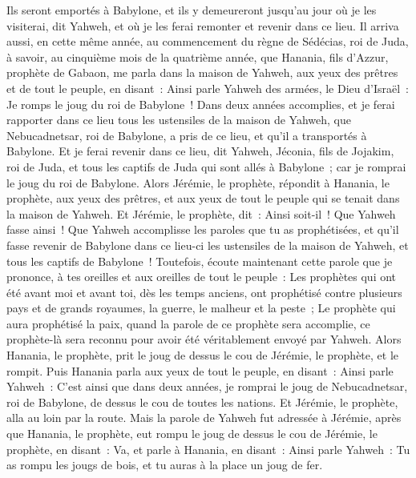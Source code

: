 \begin{multicols}{2}
Ils seront emportés à Babylone, et ils y demeureront jusqu'au jour où je les visiterai, dit Yahweh, et où je les ferai remonter et revenir dans ce lieu.
\VerseOne{}Il arriva aussi, en cette même année, au commencement du règne de Sédécias, roi de Juda, à savoir, au cinquième mois de la quatrième année, que Hanania, fils d'Azzur, prophète de Gabaon, me parla dans la maison de Yahweh, aux yeux des prêtres et de tout le peuple, en disant~:
Ainsi parle Yahweh des armées, le Dieu d'Israël~: Je romps le joug du roi de Babylone~!
Dans deux années accomplies, et je ferai rapporter dans ce lieu tous les ustensiles de la maison de Yahweh, que Nebucadnetsar, roi de Babylone, a pris de ce lieu, et qu'il a transportés à Babylone.
Et je ferai revenir dans ce lieu, dit Yahweh, Jéconia, fils de Jojakim, roi de Juda, et tous les captifs de Juda qui sont allés à Babylone~; car je romprai le joug du roi de Babylone.
Alors Jérémie, le prophète, répondit à Hanania, le prophète, aux yeux des prêtres, et aux yeux de tout le peuple qui se tenait dans la maison de Yahweh.
Et Jérémie, le prophète, dit~: Ainsi soit-il~! Que Yahweh fasse ainsi~! Que Yahweh accomplisse les paroles que tu as prophétisées, et qu'il fasse revenir de Babylone dans ce lieu-ci les ustensiles de la maison de Yahweh, et tous les captifs de Babylone~!
Toutefois, écoute maintenant cette parole que je prononce, à tes oreilles et aux oreilles de tout le peuple~:
Les prophètes qui ont été avant moi et avant toi, dès les temps anciens, ont prophétisé contre plusieurs pays et de grands royaumes, la guerre, le malheur et la peste~;
Le prophète qui aura prophétisé la paix, quand la parole de ce prophète sera accomplie, ce prophète-là sera reconnu pour avoir été véritablement envoyé par Yahweh.
Alors Hanania, le prophète, prit le joug de dessus le cou de Jérémie, le prophète, et le rompit.
Puis Hanania parla aux yeux de tout le peuple, en disant~: Ainsi parle Yahweh~: C'est ainsi que dans deux années, je romprai le joug de Nebucadnetsar, roi de Babylone, de dessus le cou de toutes les nations. Et Jérémie, le prophète, alla au loin par la route.
Mais la parole de Yahweh fut adressée à Jérémie, après que Hanania, le prophète, eut rompu le joug de dessus le cou de Jérémie, le prophète, en disant~:
Va, et parle à Hanania, en disant~: Ainsi parle Yahweh~: Tu as rompu les jougs de bois, et tu auras à la place un joug de fer.

\end{multicols}
